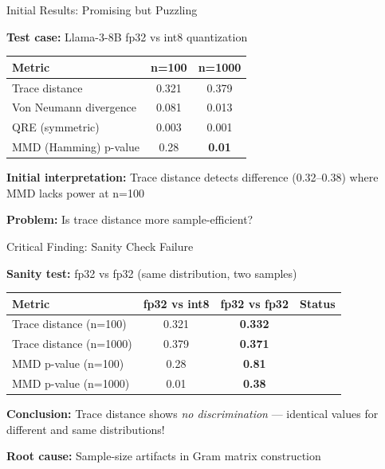 \documentclass[aspectratio=169,11pt]{beamer}
\newcommand{\good}{\textcolor{darkgreen}{\ding{51}}}
\newcommand{\bad}{\textcolor{darkred}{\ding{55}}}
\begin{document}
\begin{frame}{Initial Results: Promising but Puzzling}

\textbf{Test case:} Llama-3-8B fp32 vs int8 quantization

\vspace{0.5em}

\begin{center}
\begin{tabular}{lcc}
\toprule
\textbf{Metric} & \textbf{n=100} & \textbf{n=1000} \\
\midrule
Trace distance & 0.321 & 0.379 \\
Von Neumann divergence & 0.081 & 0.013 \\
QRE (symmetric) & 0.003 & 0.001 \\
\midrule
MMD (Hamming) p-value & 0.28 & \textbf{0.01} \good \\
\bottomrule
\end{tabular}
\end{center}

\vspace{0.5em}

\textbf{Initial interpretation:} Trace distance detects difference (0.32--0.38) where MMD lacks power at n=100

\vspace{0.5em}

\textbf{Problem:} Is trace distance more sample-efficient?

\end{frame}

\begin{frame}{Critical Finding: Sanity Check Failure}

\textbf{Sanity test:} fp32 vs fp32 (same distribution, two samples)

\vspace{0.5em}

\begin{center}
\begin{tabular}{lccc}
\toprule
\textbf{Metric} & \textbf{fp32 vs int8} & \textbf{fp32 vs fp32} & \textbf{Status} \\
\midrule
Trace distance (n=100) & 0.321 & \textbf{0.332} & \bad \\
Trace distance (n=1000) & 0.379 & \textbf{0.371} & \bad \\
MMD p-value (n=100) & 0.28 & \textbf{0.81} & \good \\
MMD p-value (n=1000) & 0.01 & \textbf{0.38} & \good \\
\bottomrule
\end{tabular}
\end{center}

\vspace{1em}

\textbf{Conclusion:} Trace distance shows \emph{no discrimination} — identical values for different and same distributions!

\vspace{0.5em}

\textbf{Root cause:} Sample-size artifacts in Gram matrix construction

\end{frame}
\end{document}
